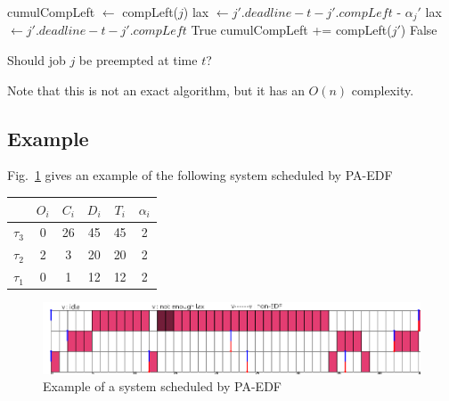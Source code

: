 \documentclass[a4paper,10pt]{article}
\begin{document}
        \begin{algorithm}[H]
            \begin{algorithmic}[1]
            \STATE cumulCompLeft $\leftarrow$ compLeft($j$)
                    \STATE lax $\leftarrow j'.deadline - t - j'.compLeft$ - $\alpha_j'$
                \ELSE
                    \STATE lax $\leftarrow j'.deadline - t - j'.compLeft$
                \ENDIF
                    \RETURN True
                \ELSE
                    \STATE cumulCompLeft += compLeft($j'$)
                \ENDIF
            \ENDFOR
            \RETURN False
            \end{algorithmic}
                \caption{Should job $j$ be preempted at time $t$?}
                \label{alg:PAEDFpreemp}
            \end{algorithm}

        Note that this is not an exact algorithm, but it has an $O(n)$ complexity.\\

    \subsection{Example}

        Fig.~\ref{fig:paedf_example} gives an example of the following system scheduled by PA-EDF

        \begin{center}
            \begin{tabular}{|r|c|c|c|c|c|}
                \hline
                            & $O_i$ & $C_i$ & $D_i$ & $T_i$ & $\alpha_i$ \\ \hline
                $\tau_3$    & 0     & 26    & 45    & 45    & 2     \\ \hline
                $\tau_2$    & 2     & 3     & 20    & 20    & 2     \\ \hline
                $\tau_1$    & 0     & 1     & 12    & 12    & 2     \\ \hline
            \end{tabular}
        \end{center}

        \begin{figure}[H]
        \begin{center}
            \centerline{\includegraphics[scale=0.6]{figs/PAEDF_example.png}}
            \caption{Example of a system scheduled by PA-EDF}
            \label{fig:paedf_example}
        \end{center}
        \end{figure}
\end{document}
